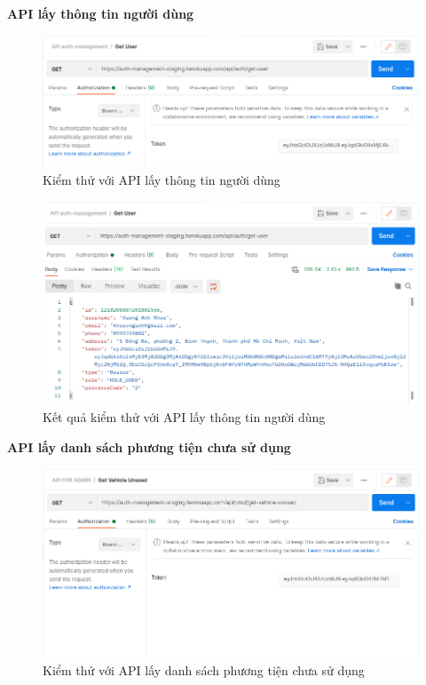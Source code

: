 		\newpage
		\textbf{API lấy thông tin người dùng}
		
		\begin{figure}[H]
			\includegraphics[width=1\textwidth]{Images/testing/API-get-user.png}
			\centering
			\linebreak
			\caption{Kiểm thử với API lấy thông tin người dùng}
		\end{figure}
		
		\begin{figure}[H]
			\includegraphics[width=1\textwidth]{Images/testing/API-get-user-result.png}
			\centering
			\linebreak
			\caption{Kết quả kiểm thử với API lấy thông tin người dùng}
		\end{figure}
		
		\newpage
		\textbf{API lấy danh sách phương tiện chưa sử dụng}
		
		\begin{figure}[H]
			\includegraphics[width=1\textwidth]{Images/testing/API-get-vehicle-unused.png}
			\centering
			\linebreak
			\caption{Kiểm thử với API lấy danh sách phương tiện chưa sử dụng}
		\end{figure}
		
